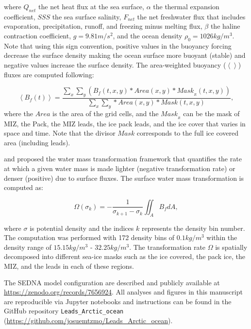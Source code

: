 \documentclass[lineno,sn-basic]{sn-jnl}%
\begin{document}
where $Q_{net}$ the net heat flux at the sea surface, $\alpha$ the thermal expansion coefficient, $SSS$ the sea surface salinity, $F_{net}$ the net freshwater flux that includes evaporation, precipitation, runoff, and freezing minus melting flux, $\beta$ the haline contraction coefficient, $g = 9.81 m/s^2$, and the ocean density $\rho_0 = 1026 kg/m^3$. 
Note that using this sign convention, positive values in the buoyancy forcing decrease the surface density making the ocean surface more buoyant (stable) and negative values increase the surface density. The area-weighted buoyancy ($ \left<\right>$) fluxes are computed following:

\begin{equation}
    \left<B_f (t)\right>  = \frac{\sum_x \sum_y \left( B_f(t,x,y) * Area(x,y) * Mask_{_R}(t,x,y)\right)}{\sum_x \sum_y * Area(x,y) * Mask(t,x,y)},
\end{equation}
where the $Area$ is the area of the grid cells, and the $Mask_{_R}$ can be the mask of MIZ, the Pack, the MIZ leads, the ice pack leads, and the ice cover that varies in space and time. Note that the divisor $Mask$ corresponds to the full ice covered area (including leads).

\citet{Nurser_WMT_1999} and  \citet{Walin_WMT_1982} proposed the water mass transformation framework that quantifies the rate at which a given water mass is made lighter (negative transformation rate) or denser (positive) due to surface fluxes. The surface water mass transformation is computed as:

\begin{equation}
    \Omega(\sigma_k) = - \frac{1}{\sigma_{k+1}-\sigma_k}\iint_AB_fdA,
\end{equation}

where $\sigma$ is potential density and the indices $k$ represents the density bin number. The computation was performed with 172 density bins of $0.1 kg/m^3$ within the density range of $15.15 kg/m^3$ - $32.25 kg/m^3$. The transformation rate $\Omega$ is spatially decomposed into different sea-ice masks such as the ice covered, the pack ice, the MIZ, and the leads in each of these regions. 

\backmatter


The SEDNA model configuration are described and publicly available at \url{https://zenodo.org/records/7656924}.
All analyses and figures in this manuscript are reproducible via Jupyter notebooks and instructions can be found in the GitHub repository \texttt{Leads\_Arctic\_ocean} (\url{https://github.com/josuemtzmo/Leads_Arctic_ocean}).
\end{document}
